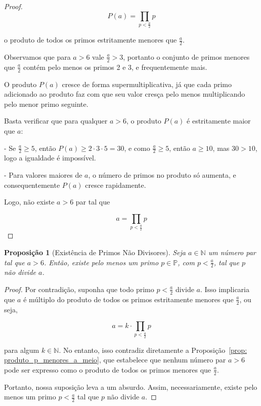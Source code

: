 \documentclass[a4paper,11pt]{article}
\newtheorem{proposition}[theorem]{Proposição}
\theoremstyle{definition}
\theoremstyle{remark}
\begin{document}
\begin{otherlanguage}{brazil}
\begin{proof}
		\[
		P(a) = \prod_{p < \frac{a}{2}} p
		\]
		
		o produto de todos os primos estritamente menores que \(\frac{a}{2}\).
		
		Observamos que para \(a > 6\) vale \(\frac{a}{2} > 3\), portanto o conjunto de primos menores que \(\frac{a}{2}\) contém pelo menos os primos 2 e 3, e frequentemente mais.
		
		O produto \(P(a)\) cresce de forma supermultiplicativa, já que cada primo adicionado ao produto faz com que seu valor cresça pelo menos multiplicando pelo menor primo seguinte.
		
		Basta verificar que para qualquer \(a > 6\), o produto \(P(a)\) é estritamente maior que \(a\):
		
		- Se \(\frac{a}{2} \geq 5\), então \(P(a) \geq 2 \cdot 3 \cdot 5 = 30\), e como \(\frac{a}{2} \geq 5\), então \(a \geq 10\), mas \(30 > 10\), logo a igualdade é impossível.
		
		- Para valores maiores de \(a\), o número de primos no produto só aumenta, e consequentemente \(P(a)\) cresce rapidamente.
		
		Logo, não existe \(a > 6\) par tal que
		
		\[
		a = \prod_{p < \frac{a}{2}} p
		\]
		
	\end{proof}
	
	\begin{proposition}[Existência de Primos Não Divisores]\label{prop:existencia_de_primos_nao_divisores}
		Seja \(a \in \mathbb{N}\) um número par tal que \(a > 6\). Então, existe pelo menos um primo \(p \in \mathbb{P}\), com \(p < \frac{a}{2}\), tal que \(p\) não divide \(a\).
	\end{proposition}
	
	\begin{proof}
		Por contradição, suponha que todo primo \(p < \frac{a}{2}\) divide \(a\). Isso implicaria que \(a\) é múltiplo do produto de todos os primos estritamente menores que \(\frac{a}{2}\), ou seja,
		
		\[
		a = k \cdot \prod_{p < \frac{a}{2}} p
		\]
		
		para algum \(k \in \mathbb{N}\). No entanto, isso contradiz diretamente a Proposição~\ref{prop: produto_p_menores_a_meio}, que estabelece que nenhum número par \(a > 6\) pode ser expresso como o produto de todos os primos menores que \(\frac{a}{2}\).
		
		Portanto, nossa suposição leva a um absurdo. Assim, necessariamente, existe pelo menos um primo \(p < \frac{a}{2}\) tal que \(p\) não divide \(a\).
		

\end{proof}
\end{otherlanguage}
\end{document}
